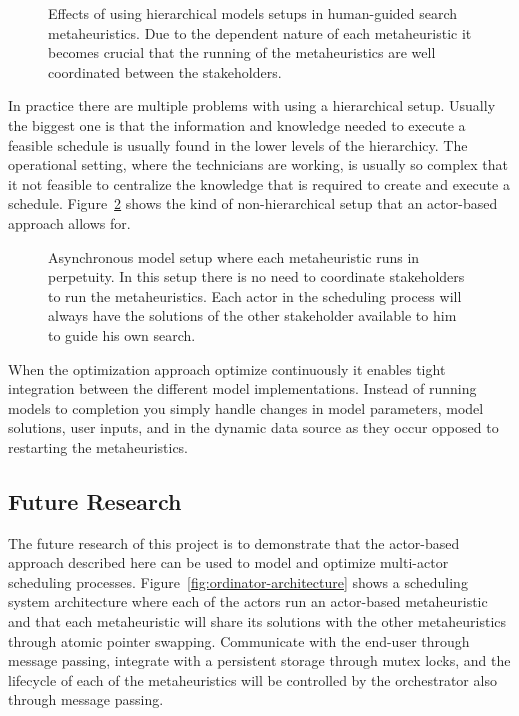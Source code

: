 \begin{figure}[H]
	
	\label{fig:discussion:hierarchical_model_setup}
	\caption{Effects of using hierarchical models setups in human-guided search metaheuristics.
	Due to the dependent nature of each metaheuristic it becomes crucial that the running of 
	the metaheuristics are well coordinated between the stakeholders.}
\end{figure}

In practice there are multiple problems with using a hierarchical setup.
Usually the biggest one is that the information and knowledge needed to 
execute a feasible schedule is usually found in the lower levels of the 
hierarchicy. The operational setting, where the
technicians are working, is usually so complex that it not feasible to 
centralize the knowledge that is required to create and execute a 
schedule. Figure~\ref{fig:discussion:asynchronous_setup}
shows the kind of non-hierarchical setup that an actor-based approach 
allows for.

\begin{figure}[H]
	
	\caption{Asynchronous model setup where each metaheuristic runs in perpetuity. In this setup
	there is no need to coordinate stakeholders to run the metaheuristics. Each actor in the 
	scheduling process will always have the solutions of the other stakeholder available to 
	him to guide his own search.}
	\label{fig:discussion:asynchronous_setup}
\end{figure}

When the optimization approach optimize continuously it enables tight
integration between the different model implementations. Instead of running
models to completion you simply handle changes in model parameters, model
solutions, user inputs, and in the dynamic data source as they occur opposed to
restarting the metaheuristics.

\subsection{Future Research}
\label{sec:discussion:future_research}
The future research of this project is to demonstrate that
the actor-based approach described here can be used to model and optimize 
multi-actor scheduling processes. 
Figure~\ref{fig:ordinator-architecture}
shows a scheduling system architecture where each of the actors run an actor-based metaheuristic
and that each metaheuristic will share its solutions with the other
metaheuristics through atomic pointer swapping. Communicate with the end-user
through message passing, integrate with a persistent storage through mutex
locks, and the lifecycle of each of the metaheuristics will be controlled by
the orchestrator also through message passing. 

